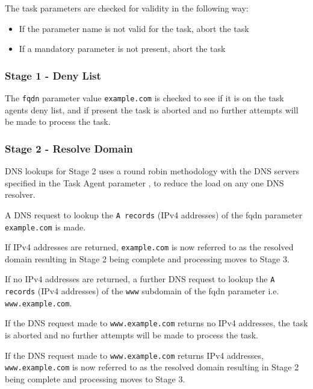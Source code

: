 \documentclass{mscreport}
\begin{document}
The task parameters are checked for validity in the following way:
\begin{itemize}
	\setlength\itemsep{0.1em}
    \item If the parameter name is not valid for the task, abort the task
    \item If a mandatory parameter is not present, abort the task
\end{itemize}

\subsubsection{Stage 1 - Deny List}

The \texttt{fqdn} parameter value \texttt{example.com} is checked to see if it is on the task agents deny list, and if present the task is aborted and no further attempts will be made to process the task.

\subsubsection{Stage 2 - Resolve Domain}

DNS lookups for Stage 2 uses a round robin methodology with the DNS servers specified in the Task Agent parameter \texttt{}, to reduce the load on any one DNS resolver.

\vspace{0.3cm} \noindent
A DNS request to lookup the \texttt{A records} (IPv4 addresses) of the fqdn parameter \texttt{example.com} is made.

\vspace{0.3cm} \noindent
If IPv4 addresses are returned, \texttt{example.com} is now referred to as the resolved domain resulting in Stage 2 being complete and processing moves to Stage 3.

\vspace{0.3cm} \noindent
If no IPv4 addresses are returned, a further DNS request to lookup the \texttt{A records} (IPv4 addresses) of the \texttt{www} subdomain of the fqdn parameter i.e. \texttt{www.example.com}.

\vspace{0.3cm} \noindent
If the DNS request made to \texttt{www.example.com} returns no IPv4 addresses, the task is aborted and no further attempts will be made to process the task.

\vspace{0.3cm} \noindent
If the DNS request made to \texttt{www.example.com} returns IPv4 addresses, \texttt{www.example.com} is now referred to as the resolved domain resulting in Stage 2 being complete and processing moves to Stage 3.
\end{document}
